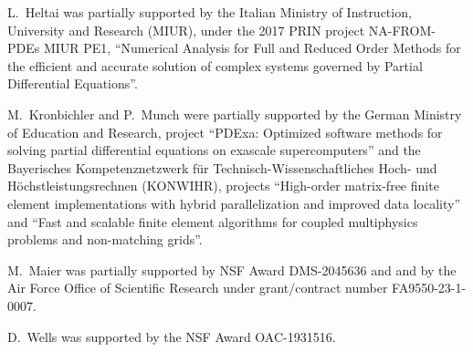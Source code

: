 \documentclass{ansarticle-preprint}
\begin{document}
L.~Heltai was partially supported by the Italian Ministry of Instruction,
University and Research (MIUR), under the 2017 PRIN project NA-FROM-PDEs MIUR
PE1, ``Numerical Analysis for Full and Reduced Order Methods for the efficient
and accurate solution of complex systems governed by Partial Differential
Equations''.

M.~Kronbichler and P.~Munch were partially supported by the
German Ministry of Education and Research, project
``PDExa: Optimized software methods for solving partial differential
equations on exascale supercomputers'' and the Bayerisches Kompetenznetzwerk
f\"ur Technisch-Wissen\-schaft\-li\-ches Hoch- und H\"ochstleistungsrechnen
(KONWIHR), projects ``High-order matrix-free finite
element implementations with hybrid parallelization and improved data
locality'' and ``Fast and scalable finite element algorithms for coupled
multiphysics problems and non-matching grids''.

M.~Maier was partially supported by NSF Award DMS-2045636 and and by the
Air Force Office of Scientific Research under grant/contract number
FA9550-23-1-0007.

D.~Wells was supported by the NSF Award OAC-1931516.




{}

\end{document}

